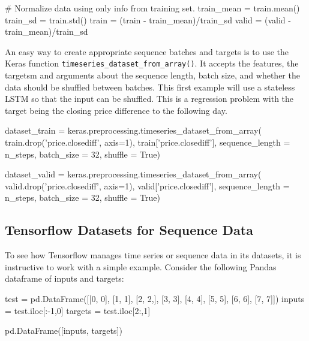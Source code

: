 \begin{samepage}
\begin{pythoncode}
# Normalize data using only info from training set.
train_mean = train.mean()
train_sd = train.std()
train = (train - train_mean)/train_sd
valid = (valid - train_mean)/train_sd
\end{pythoncode}
\end{samepage}

An easy way to create appropriate sequence batches and targets is to use the Keras function \texttt{timeseries\_dataset\_from\_array()}. It accepts the features, the targetsm and arguments about the sequence length, batch size, and whether the data should be shuffled between batches. This first example will use a stateless LSTM so that the input can be shuffled. This is a regression problem with the target being the closing price difference to the following day.

\begin{samepage}
\begin{pythoncode}
dataset_train = keras.preprocessing.timeseries_dataset_from_array(
    train.drop('price.closediff', axis=1), 
    train['price.closediff'],
    sequence_length = n_steps,
    batch_size = 32,
    shuffle = True)
\end{pythoncode}
\end{samepage}

\begin{samepage}
\begin{pythoncode}
dataset_valid = keras.preprocessing.timeseries_dataset_from_array(
    valid.drop('price.closediff', axis=1), 
    valid['price.closediff'],
    sequence_length = n_steps,
    batch_size = 32,
    shuffle = True)
\end{pythoncode}
\end{samepage}

\subsection*{Tensorflow Datasets for Sequence Data}

To see how Tensorflow manages time series or sequence data in its datasets, it is instructive to work with a simple example. Consider the following Pandas dataframe of inputs and targets:

\begin{samepage}
\begin{pythoncode}
test = pd.DataFrame([[0, 0], [1, 1], [2, 2,], [3, 3], 
                     [4, 4], [5, 5], [6, 6], [7, 7]]) 
inputs = test.iloc[:-1,0]
targets = test.iloc[2:,1]

pd.DataFrame([inputs, targets])
\end{pythoncode}
\end{samepage}

